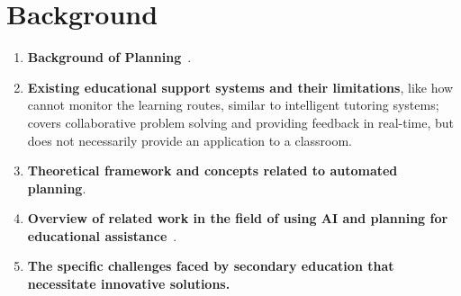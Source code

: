 \section{Background}
\begin{enumerate}
    \item \textbf{Background of Planning}~\cite{Scala2016,ScalaHaslum2016}.
    \item \textbf{Existing educational support systems and their limitations}, like how~\citet{Garrido2009} cannot monitor the learning routes, similar to intelligent tutoring systems;~\citet{Rojas2022} covers collaborative problem solving and providing feedback in real-time, but does not necessarily provide an application to a classroom.
    \item \textbf{Theoretical framework and concepts related to automated planning}.
    \item \textbf{Overview of related work in the field of using AI and planning for educational assistance}~\cite{Castillo2009}.
    \item \textbf{The specific challenges faced by secondary education that necessitate innovative solutions.}
\end{enumerate}
